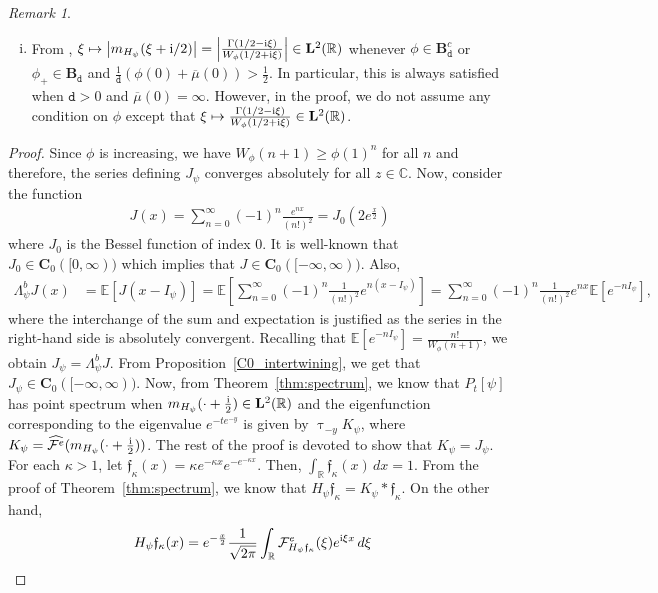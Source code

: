 \documentclass[12pt]{amsart}
\numberwithin{equation}{section}
\newcommand{\bb}{\mathbb}
\newcommand{\cc}{\mathcal}
\renewcommand{\ge}{\geqslant}
\newcommand{\mf}{\mathfrak}
\newcommand{\ttt}{\mathtt}
\newcommand{\bmrm}[2][2]{\mathbf{#2}^{#1}}
\newcommand{\Jp}{J_{\psi}}
\newcommand{\Hpsi}{H_\psi}
\newcommand{\fouho}{\cc{F}^{e}}
\newcommand{\C}{\mathbf{C}}
\newcommand{\B}{\mathbf{B}}
\renewcommand{\i}{\mathrm{i}}
\renewcommand{\tau}{\uptau}
\theoremstyle{definition}
\theoremstyle{assump}
\theoremstyle{remark}
\newtheorem{rem}[thm]{Remark}
\begin{document}
{\begin{rem}
\begin{enumerate}[(i)]
\item From  \cite[Proposition 6.2]{patie2018}, $\xi \mapsto\left|m_{\Hpsi}(\xi+\i/2)\right|=\left|\frac{\Gamma(1/2-{\rm{i}}\xi   )}{W_{\phi}(1/2+\mathrm{i}\xi)}\right|\in\bmrm{L}(\bb{R})$ whenever $\phi\in\B^c_\ttt{d}$ or  $\phi_+\in\B_\ttt{d}$ and $\frac{1}{\ttt{d}}(\phi(0)+\overline{\mu}(0))>\frac{1}{2}$. In particular, this is always satisfied when $\ttt{d}>0$ and $\overline{\mu}(0)=\infty$. However, in the proof, we do not assume any condition on $\phi$ except that $\xi\mapsto\frac{\Gamma(1/2-{\rm{i}}\xi   )}{W_{\phi}(1/2+\mathrm{i}\xi)}\in\bmrm{L}(\bb{R})$.
\end{enumerate}
\end{rem}
\begin{proof} Since $\phi$ is increasing, we have  $W_{\phi}(n+1)\ge\phi(1)^n$ for all $n$ and therefore, the series defining $\Jp$ converges absolutely for all $z\in\bb{C}$. Now, consider the function
\begin{align*}
J(x)=\sum_{n=0}^\infty(-1)^n\frac{e^{nx}}{(n!)^2}=J_0\left(2e^{\frac{x}{2}}\right)
\end{align*}
where $J_0$ is the Bessel function of index $0$. It is well-known that $J_0\in \C_0([0,\infty))$ which implies that $J\in \C_0([-\infty,\infty))$. Also,
\begin{align*}
\Lambda^b_\psi J(x)&=\bb{E}[J(x-{I}_\psi)]
=\bb{E}\left[\sum_{n=0}^\infty(-1)^n\frac{1}{(n!)^2}e^{n(x-{I}_\psi)}\right]
=\sum_{n=0}^\infty (-1)^n\frac{1}{(n!)^2}e^{nx}\bb{E}[e^{-n{I}_\psi}],
\end{align*}
where the interchange of the sum and expectation is justified as the series in the right-hand side is absolutely convergent. Recalling that $\bb{E}[e^{-n{I}_\psi}]=\frac{n!}{W_{\phi}(n+1)}$, we obtain $\Jp=\Lambda^b_\psi J$. From Proposition~\ref{C0_intertwining}, we get that $\Jp\in \C_0([-\infty,\infty))$. Now, from Theorem~\ref{thm:spectrum}, we know that $P_t[\psi]$ has point spectrum when $m_{\Hpsi}(\cdot+\frac{{\rm{i}}}{2}   )\in\bmrm{L}(\bb{R})$ and the eigenfunction corresponding to the eigenvalue $e^{-te^{-y}}$ is given by $\tau_{-y}K_\psi$, where $K_\psi=\widehat{\fouho}(m_{\Hpsi}(\cdot+\frac{{\rm{i}}}{2}))$. The rest of the proof is devoted to show that $K_\psi=\Jp$. For each $\kappa>1$, let $\mf{f}_\kappa(x)=\kappa e^{-\kappa x}e^{-e^{-\kappa x}}$. Then, $\int_\bb{R}\mf{f}_\kappa(x)\,dx=1$. From the proof of Theorem~\ref{thm:spectrum}, we know that $\Hpsi\mf{f}_\kappa=K_\psi\ast\mf{f}_\kappa$. On the other hand,
\begin{align*}
\Hpsi\mf{f}_\kappa(x)&=e^{-\frac{x}{2}}\frac{1}{\sqrt{2\pi}}\int_{\bb{R}}\fouho_ {\Hpsi\mf{f}_\kappa}(\xi)e^{{\rm{i}}\xi x}\,d\xi

\end{align*}
\end{proof}}
\end{document}
